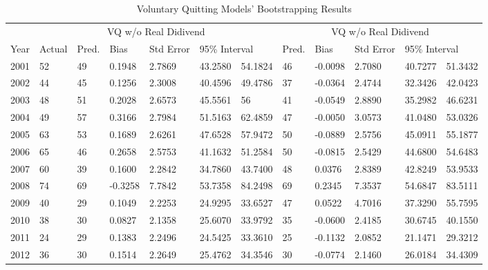 \begin{table}[]
	\centering
	\scriptsize
	\caption{Voluntary Quitting Models' Bootstrapping Results}
	\label{tab:bootvq}
	\begin{tabular}{llllllllllll}
		\toprule
		& \multicolumn{6}{c}{VQ w/o Real Didivend}                                                   & \multicolumn{5}{c}{VQ w/o Real Didivend}                                           \\
		Year & Actual & Pred.  & Bias    & Std Error & \multicolumn{2}{l}{95\% Interval} & Pred. & Bias    & Std Error & \multicolumn{2}{l}{95\% Interval} \\  \midrule
		2001 & 52     & 49                 & 0.1948  & 2.7869    & 43.2580         & 54.1824         & 46                & -0.0098 & 2.7080    & 40.7277         & 51.3432         \\
		2002 & 44     & 45                & 0.1256  & 2.3008    & 40.4596         & 49.4786         & 37                 & -0.0364 & 2.4744    & 32.3426         & 42.0423         \\
		2003 & 48     & 51               & 0.2028  & 2.6573    & 45.5561         & 56       & 41                 & -0.0549 & 2.8890    & 35.2982         & 46.6231         \\
		2004 & 49     & 57              & 0.3166  & 2.7984    & 51.5163         & 62.4859         & 47                 & -0.0050 & 3.0573    & 41.0480         & 53.0326         \\
		2005 & 63     & 53                & 0.1689  & 2.6261    & 47.6528         & 57.9472         & 50                 & -0.0889 & 2.5756    & 45.0911         & 55.1877         \\
		2006 & 65     & 46                 & 0.2658  & 2.5753    & 41.1632         & 51.2584         & 50                  & -0.0815 & 2.5429    & 44.6800         & 54.6483         \\
		2007 & 60     & 39                & 0.1600  & 2.2842    & 34.7860         & 43.7400         & 48                  & 0.0376  & 2.8389    & 42.8249         & 53.9533         \\
		2008 & 74     & 69                 & -0.3258 & 7.7842    & 53.7358         & 84.2498         & 69                 & 0.2345  & 7.3537    & 54.6847         & 83.5111         \\
		2009 & 40     & 29               & 0.1049  & 2.2253    & 24.9295         & 33.6527         & 47                 & 0.0522  & 4.7016    & 37.3290         & 55.7595         \\
		2010 & 38     & 30               & 0.0827  & 2.1358    & 25.6070         & 33.9792         & 35               & -0.0600 & 2.4185    & 30.6745         & 40.1550         \\
		2011 & 24     & 29               & 0.1383  & 2.2496    & 24.5425         & 33.3610         & 25                 & -0.1132 & 2.0852    & 21.1471         & 29.3212         \\
		2012 & 36     & 30               & 0.1514  & 2.2649    & 25.4762         & 34.3546         & 30                & -0.0774 & 2.1460    & 26.0184         & 34.4309  \\ \bottomrule
		     

\end{tabular}
\end{table}
